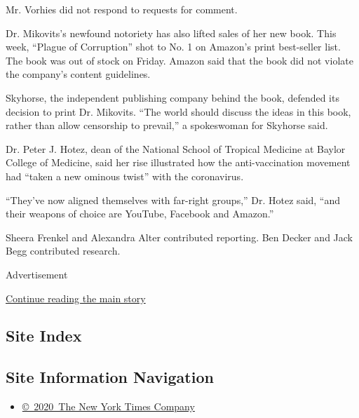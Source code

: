 Mr. Vorhies did not respond to requests for comment.

Dr. Mikovits's newfound notoriety has also lifted sales of her new book.
This week, ``Plague of Corruption'' shot to No. 1 on Amazon's print
best-seller list. The book was out of stock on Friday. Amazon said that
the book did not violate the company's content guidelines.

Skyhorse, the independent publishing company behind the book, defended
its decision to print Dr. Mikovits. ``The world should discuss the ideas
in this book, rather than allow censorship to prevail,'' a spokeswoman
for Skyhorse said.

Dr. Peter J. Hotez, dean of the National School of Tropical Medicine at
Baylor College of Medicine, said her rise illustrated how the
anti-vaccination movement had ``taken a new ominous twist'' with the
coronavirus.

``They've now aligned themselves with far-right groups,'' Dr. Hotez
said, ``and their weapons of choice are YouTube, Facebook and Amazon.''

Sheera Frenkel and Alexandra Alter contributed reporting. Ben Decker and
Jack Begg contributed research.

Advertisement

\protect\hyperlink{after-bottom}{Continue reading the main story}

\hypertarget{site-index}{%
\subsection{Site Index}\label{site-index}}

\hypertarget{site-information-navigation}{%
\subsection{Site Information
Navigation}\label{site-information-navigation}}

\begin{itemize}
\tightlist
\item
  \href{https://help.nytimes.com/hc/en-us/articles/115014792127-Copyright-notice}{©~2020~The
  New York Times Company}
\end{itemize}

